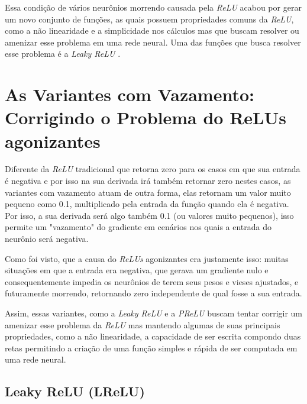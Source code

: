 Essa condição de vários neurônios morrendo causada pela \textit{ReLU} acabou por gerar um novo conjunto de funções, as quais possuem propriedades comuns da \textit{ReLU}, como a não linearidade e a simplicidade nos cálculos mas que buscam resolver ou amenizar esse problema em uma rede neural. Uma das funções que busca resolver esse problema é a \textit{Leaky ReLU} \parencite{DyingReluDouglas}.

\section{As Variantes com Vazamento: Corrigindo o Problema do ReLUs agonizantes}

Diferente da \textit{ReLU} tradicional que retorna zero para os casos em que sua entrada é negativa e por isso na sua derivada irá também retornar zero nestes casos, as variantes com vazamento atuam de outra forma, elas retornam um valor muito pequeno como 0.1, multiplicado pela entrada da função quando ela é negativa. Por isso, a sua derivada será algo também 0.1 (ou valores muito pequenos), isso permite um "vazamento" do gradiente em cenários nos quais a entrada do neurônio será negativa.

Como foi visto, que a causa do \textit{ReLUs} agonizantes era justamente isso: muitas situações em que a entrada era negativa, que gerava um gradiente nulo e consequentemente impedia os neurônios de terem seus pesos e vieses ajustados, e futuramente morrendo, retornando zero independente de qual fosse a sua entrada.

Assim, essas variantes, como a \textit{Leaky ReLU} e a \textit{PReLU} buscam tentar corrigir um amenizar esse problema da \textit{ReLU} mas mantendo algumas de suas principais propriedades, como a não linearidade, a capacidade de ser escrita compondo duas retas permitindo a criação de uma função simples e rápida de ser computada em uma rede neural.

\subsection{Leaky ReLU (LReLU)}

